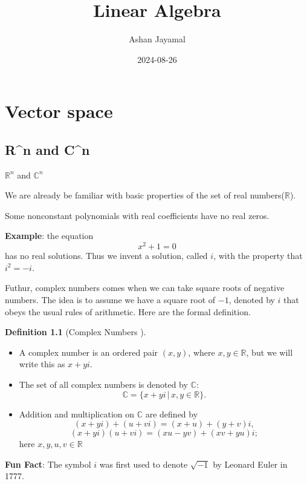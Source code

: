 \documentclass[
]{book}
\title{Linear Algebra}
\author{Ashan Jayamal}
\date{2024-08-26}
\providecommand{\tightlist}{%
  \setlength{\itemsep}{0pt}\setlength{\parskip}{0pt}}
\theoremstyle{definition}
\newtheorem{definition}{Definition}[chapter]
\theoremstyle{definition}
\theoremstyle{definition}
\theoremstyle{definition}
\theoremstyle{remark}
\begin{document}
\maketitle

{
\setcounter{tocdepth}{1}
\tableofcontents
}
\chapter{Vector space}\label{vector-space}

\section{R\^{}n and C\^{}n}\label{rn-and-cn}

\(\mathbb{R}^n\) and \(\mathbb{C}^n\)

We are already be familiar with basic properties of the set of real numbers(\(\mathbb{R}\)).

Some nonconstant polynomials with real coefficients have no real
zeros.

\textbf{Example}: the equation
\[x^2+1=0\]
has no real solutions.
Thus we invent a solution, called \(i\), with the property that \(i^2 = -i\).

Futhur, complex numbers comes when we can take square roots of negative numbers. The idea is to assume we have a square root of \(−1\), denoted by \(i\) that obeys the usual rules of arithmetic. Here are the formal definition.

\begin{definition}[Complex Numbers ]
\protect\hypertarget{def:unnamed-chunk-1}{}\label{def:unnamed-chunk-1}\leavevmode

\begin{itemize}
\tightlist
\item
  A complex number is an ordered pair \((x, y)\), where \(x, y \in \mathbb{R}\), but we will write this as \(x + yi\).
\item
  The set of all complex numbers is denoted by \(\mathbb{C}\):
  \[\mathbb{C} = \{x + yi \,|\, x, y \in \mathbb{R}\}.\]
\item
  Addition and multiplication on \(\mathbb{C}\) are defined by
  \[(x + yi) + (u + vi) = (x + u) + (y + v)i,\]
  \[(x + yi)(u + vi) = (xu - yv) + (xv + yu)i;\]
  here \(x, y, u, v \in \mathbb{R}\)
\end{itemize}

\end{definition}

\textbf{Fun Fact}: The symbol \(i\) was first used to denote \(\sqrt{-1}\) by Leonard Euler in 1777.
\end{document}
